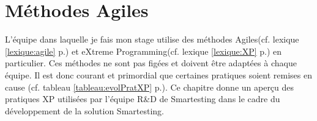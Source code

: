 \chapter{Méthodes Agiles}\label{agile}
L'équipe dans laquelle je fais mon stage utilise des méthodes Agiles(cf. lexique \ref{lexique:agile} p.\pageref{lexique:agile}) et eXtreme Programming(cf. lexique \ref{lexique:XP} p.\pageref{lexique:XP}) en particulier. Ces méthodes ne sont pas figées et doivent être adaptées à chaque équipe. Il est donc courant et primordial que certaines pratiques soient remises en cause (cf. tableau \ref{tableau:evolPratXP} p.\pageref{tableau:evolPratXP}). Ce chapitre donne un aperçu des pratiques XP utilisées par l'équipe R\&D de Smartesting dans le cadre du développement de la solution Smartesting.
